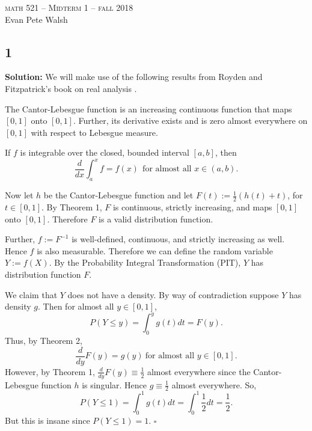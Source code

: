 \documentclass[12pt]{article}
\newcounter{ProofCounter}
\newenvironment{Solution}{\stepcounter{ProofCounter}\textbf{Solution:}}{\hfill$\square$}
\begin{document}
\thispagestyle{empty}
\begin{center}
  \Large \textsc{math 521 -- Midterm 1 -- fall 2018} \\ 
  \vspace{5mm}
  \large Evan Pete Walsh
\end{center}


\subsection*{1}
\begin{Solution}
  We will make use of the following results from Royden and Fitzpatrick's book on real analysis \cite{RF}. \\

  \begin{Theorem}
    The Cantor-Lebesgue function is an increasing continuous function that maps $[0, 1]$ onto $[0, 1]$. Further, its derivative exists and is zero almost everywhere on $[0, 1]$ with respect to Lebesgue measure.
  \end{Theorem}

  \vspace{5mm}

  \begin{Theorem}
    If $f$ is integrable over the closed, bounded interval $[a, b]$, then
    \[
      \frac{d}{dx} \int_{a}^{x} f = f(x) \ \ \text{for almost all $x \in (a, b)$}.
    \]
  \end{Theorem}

  \vspace{5mm}

  Now let $h$ be the Cantor-Lebesgue function and let $F(t) := \frac{1}{2}(h(t) + t)$, for $t \in [0, 1]$. By Theorem 1, $F$ is continuous, strictly increasing, and maps $[0, 1]$ onto $[0, 1]$. Therefore $F$ is a valid distribution function.
  
  Further, $f := F^{-1}$ is well-defined, continuous, and strictly increasing as well. Hence $f$ is also measurable. Therefore we can define the random variable $Y := f(X)$. By the Probability Integral Transformation (PIT), $Y$ has distribution function $F$.

  We claim that $Y$ does not have a density. By way of contradiction suppose $Y$ has density $g$. Then for almost all $y \in [0, 1]$,
  \[
    P(Y \leq y) = \int_{0}^{y} g(t) dt = F(y).
  \]
  Thus, by Theorem 2,
  \[
    \frac{d}{dy} F(y) = g(y) \ \text{for almost all $y \in [0, 1]$}.
  \]
  However, by Theorem 1, $\frac{d}{dy} F(y) \equiv \frac{1}{2}$ almost everywhere since the Cantor-Lebesgue function $h$ is singular. Hence $g \equiv \frac{1}{2}$ almost everywhere.
  So,
  \[
    P(Y \leq 1) = \int_{0}^{1}g(t)dt = \int_{0}^{1} \frac{1}{2} dt = \frac{1}{2}.
  \]
  But this is insane since $P(Y \leq 1) = 1$.
\end{Solution}
\end{document}
